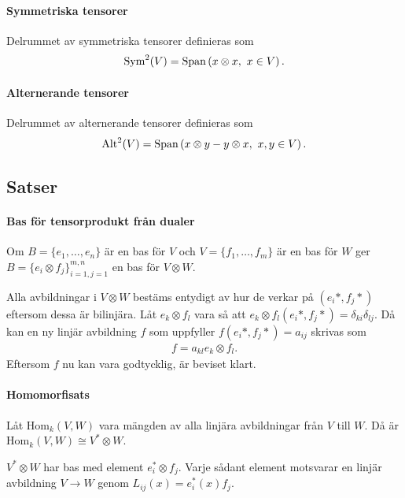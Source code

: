 \paragraph{Symmetriska tensorer}
Delrummet av symmetriska tensorer definieras som
\begin{align*}
	\Sym[2]{V} = \Span{x\otimes x,\ x\in V}.
\end{align*}

\paragraph{Alternerande tensorer}
Delrummet av alternerande tensorer definieras som
\begin{align*}
	\Alt[2]{V} = \Span{x\otimes y - y\otimes x,\ x, y\in V}.
\end{align*}

\subsection{Satser}

\paragraph{Bas för tensorprodukt från dualer}
Om $B = \{e_{1}, \dots, e_{n}\}$ är en bas för $V$ och $V = \{f_{1}, \dots, f_{m}\}$ är en bas för $W$ ger $B = \{e_{i}\otimes f_{j}\}_{i = 1, j = 1}^{m, n}$ en bas för $V\otimes W$.

\proof
Alla avbildningar i $V\otimes W$ bestäms entydigt av hur de verkar på $(e_{i}*, f_{j}*)$ eftersom dessa är bilinjära. Låt $e_{k}\otimes f_{l}$ vara så att $e_{k}\otimes f_{l}(e_{i}*, f_{j}*) = \delta_{ki}\delta_{lj}$. Då kan en ny linjär avbildning $f$ som uppfyller $f(e_{i}*, f_{j}*) = a_{ij}$ skrivas som
\begin{align*}
	f = a_{kl}e_{k}\otimes f_{l}.
\end{align*}
Eftersom $f$ nu kan vara godtycklig, är beviset klart.

\paragraph{Homomorfisats}
Låt $\text{Hom}_{k}(V, W)$ vara mängden av alla linjära avbildningar från $V$ till $W$. Då är $\text{Hom}_{k}(V, W)\cong V^{*}\otimes W$.

\proof
$V^{*}\otimes W$ har bas med element $e_{i}^{*}\otimes f_{j}$. Varje sådant element motsvarar en linjär avbildning $V\to W$ genom $L_{ij}(x) = e_{i}^{*}(x) f_{j}$.

